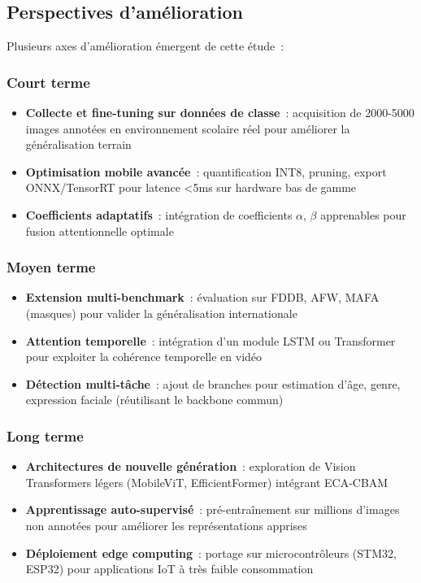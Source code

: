 \begin{onehalfspace}
\subsection{Perspectives d'amélioration}

\hspace{0.65 cm}Plusieurs axes d'amélioration émergent de cette étude~:

\subsubsection{Court terme}

\begin{itemize}
\item \textbf{Collecte et fine-tuning sur données de classe}~: acquisition de 2000-5000 images annotées en environnement scolaire réel pour améliorer la généralisation terrain
\item \textbf{Optimisation mobile avancée}~: quantification INT8, pruning, export ONNX/TensorRT pour latence <5ms sur hardware bas de gamme
\item \textbf{Coefficients adaptatifs}~: intégration de coefficients $\alpha$, $\beta$ apprenables pour fusion attentionnelle optimale
\end{itemize}

\subsubsection{Moyen terme}

\begin{itemize}
\item \textbf{Extension multi-benchmark}~: évaluation sur FDDB, AFW, MAFA (masques) pour valider la généralisation internationale
\item \textbf{Attention temporelle}~: intégration d'un module LSTM ou Transformer pour exploiter la cohérence temporelle en vidéo
\item \textbf{Détection multi-tâche}~: ajout de branches pour estimation d'âge, genre, expression faciale (réutilisant le backbone commun)
\end{itemize}

\subsubsection{Long terme}

\begin{itemize}
\item \textbf{Architectures de nouvelle génération}~: exploration de Vision Transformers légers (MobileViT, EfficientFormer) intégrant ECA-CBAM
\item \textbf{Apprentissage auto-supervisé}~: pré-entraînement sur millions d'images non annotées pour améliorer les représentations apprises
\item \textbf{Déploiement edge computing}~: portage sur microcontrôleurs (STM32, ESP32) pour applications IoT à très faible consommation
\end{itemize}


\end{onehalfspace}
